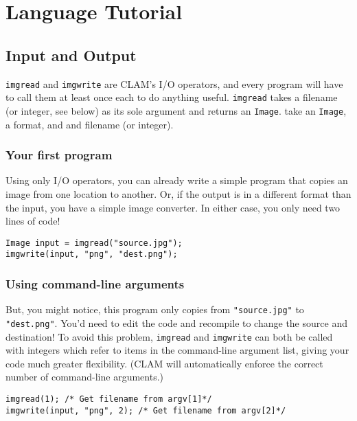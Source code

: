 \chapter{Language Tutorial}

\section{Input and Output}

\texttt{imgread} and \texttt{imgwrite} are CLAM's I/O operators, and every program 
will have to call them at least once each to do anything useful. \texttt{imgread}
takes a filename (or integer, see below) as its sole argument and returns an \texttt{Image}.
 take an \texttt{Image}, a format, and and filename (or integer). 

\subsection{Your first program}

Using only I/O operators, you can already write a simple program that copies an image from
one location to another. Or, if the output is in a different format than the input,
you have a simple image converter. In either case, you only need two lines of code!

\begin{lstlisting}[language=CLAM,escapechar=\%]
Image input = imgread("source.jpg");
imgwrite(input, "png", "dest.png");
\end{lstlisting}

\subsection{Using command-line arguments}

But, you might notice, this program only copies from \texttt{"source.jpg"} to \texttt{"dest.png"}.
You'd need to edit the code and recompile to change the source and destination!
To avoid this problem, \texttt{imgread} and \texttt{imgwrite} can both be called with integers
which refer to items in the command-line argument list, giving your code much greater
flexibility. (CLAM will automatically enforce the correct number of command-line arguments.)

\begin{lstlisting}[language=CLAM,escapechar=\%]
imgread(1); /* Get filename from argv[1]*/
imgwrite(input, "png", 2); /* Get filename from argv[2]*/
\end{lstlisting}

